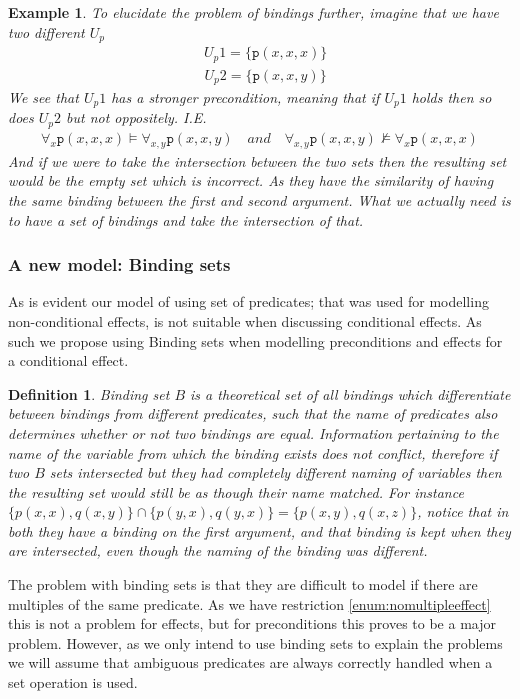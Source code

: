 \documentclass[../Master.tex]{subfiles}
\begin{document}
\newtheorem{thm-sokoban-2}{Example}[section]
\begin{thm-sokoban-2}\label{thm:sokoban-2}
To elucidate the problem of bindings further, imagine that we have two different $U_p$
\begin{align*}
&U_p1 = \{ \texttt{p}(x, x, x) \} 
\end{align*}
\begin{align*}
&U_p2 = \{ \texttt{p}(x, x, y) \} 
\end{align*}
We see that $U_p1$ has a stronger precondition, meaning that if $U_p1$ holds then so does $U_p2$ but not oppositely. I.E.
\begin{align*}
&\forall_{x} \texttt{p}(x, x, x) \vDash \forall_{x, y} \texttt{p}(x, x, y)  \quad and \quad
 \forall_{x, y} \texttt{p}(x, x, y) \nvDash \forall_{x} \texttt{p}(x, x, x)  &
\end{align*}
And if we were to take the intersection between the two sets then the resulting set would be the empty set which is incorrect. As they have the similarity of having the same binding between the first and second argument. What we actually need is to have a set of bindings and take the intersection of that.
\end{thm-sokoban-2}
\subsubsection{A new model: Binding sets}
As is evident our model of using set of predicates; that was used for modelling non-conditional effects, is not suitable when discussing conditional effects. As such we propose using Binding sets when modelling preconditions and effects for a conditional effect.
\newtheorem{thm-binding-set}{Definition}
\begin{thm-binding-set}\label{thm:binding-set}
	Binding set $B$ is a theoretical set of all bindings which differentiate between bindings from different predicates, such that the name of predicates also determines whether or not two bindings are equal. Information pertaining to the name of the variable from which the binding exists does not conflict, therefore if two $B$ sets intersected but they had completely different naming of variables then the resulting set would still be as though their name matched.
	For instance $\{p(x,x), q(x,y)\} \cap \{p(y,x), q(y,x)\} = \{p(x,y), q(x,z)\}$, notice that in both they have a binding on the first argument, and that binding is kept when they are intersected, even though the naming of the binding was different.
\end{thm-binding-set}
The problem with binding sets is that they are difficult to model if there are multiples of the same predicate. As we have restriction \ref{enum:nomultipleeffect} this is not a problem for effects, but for preconditions this proves to be a major problem. However, as we only intend to use binding sets to explain the problems we will assume that ambiguous predicates are always correctly handled when a set operation is used.
\end{document}
